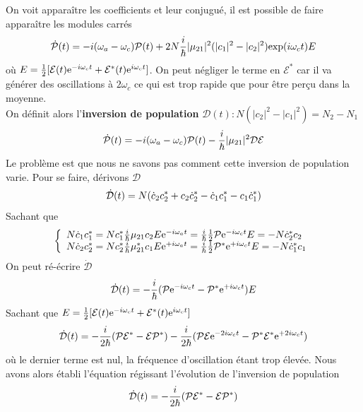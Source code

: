 On voit apparaître les coefficients et leur conjugué, il est possible de faire apparaître les 
modules carrés
\begin{equation}
\dot {\cal P}(t) =  - i({\omega _a} - {\omega _c}){\cal P}(t) + 2N\frac{i}{\hbar }|{\mu _{21}}{|^2}(|{c_1}{|^2} - |{c_2}{|^2}){\rm{exp(}}i{\omega _c}t{\rm{)}}E
\end{equation}
où $E = \frac{1}{2}[{\cal E}(t){{\rm{e}}^{ - i{\omega _c}t}} + {{\cal E}^*}(t){{\rm{e}}^{i{\omega _c}t}}]$. On peut négliger le terme en $\mathcal{E}^*$ car il va générer des oscillations à $2\omega_c$ 
ce qui est trop rapide que pour être perçu dans la moyenne.\\

On définit alors l'\textbf{inversion de population} $\mathcal{D}(t) : N(|c_2|^2-|c_1|^2) = N_2-N_1$ 
\begin{equation}
\dot {\cal P}(t) =  - i({\omega _a} - {\omega _c}){\cal P}(t) - \frac{i}{\hbar }|{\mu _{21}}{|^2}{\cal D}{\cal E}
\end{equation}
Le problème est que nous ne savons pas comment cette inversion de population varie. Pour se faire, 
dérivons $\mathcal{D}$
\begin{equation}
\dot {\cal D}(t) = N({\dot c_2}c_2^* + {c_2}\dot c_2^* - {\dot c_1}c_1^* - {c_1}\dot c_1^*)
\end{equation}
Sachant que
\begin{equation}
\left\{\begin{array}{ll}
N{\dot c_1}c_1^* = Nc_1^*\frac{i}{\hbar }{\mu _{21}}{c_2}E{{\rm{e}}^{ - i{\omega _a}t}} = \frac{i}{\hbar }\frac{1}{2}{\cal P}{{\rm{e}}^{ - i{\omega _c}t}}E =  - N\dot c_2^*{c_2}\\
N{\dot c_2}c_2^* = Nc_2^*\frac{i}{\hbar }\mu _{21}^*{c_1}E{{\rm{e}}^{ + i{\omega _a}t}} = \frac{i}{\hbar }\frac{1}{2}{{\cal P}^*}{{\rm{e}}^{ + i{\omega _c}t}}E =  - N\dot c_1^*{c_1}
\end{array}\right.
\end{equation}
On peut ré-écrire $\dot{\mathcal{D}}$
\begin{equation}
\dot {\cal D}(t) =  - \frac{i}{\hbar }({\cal P}{{\rm{e}}^{ - i{\omega _c}t}} - {{\cal P}^*}{{\rm{e}}^{ + i{\omega _c}t}})E
\end{equation}
Sachant que $E = \frac{1}{2}[{\cal E}(t){{\rm{e}}^{ - i{\omega _c}t}} + {{\cal E}^*}(t){{\rm{e}}^{i{\omega _c}t}}]$
\begin{equation}
\dot {\cal D}(t) =  - \frac{i}{{2\hbar }}({\cal P}{{\cal E}^*} - {\cal E}{{\cal P}^*}) - \frac{i}{{2\hbar }}({\cal P}{\cal E}{{\rm{e}}^{ - 2i{\omega _c}t}} - {{\cal P}^*}{{\cal E}^*}{{\rm{e}}^{ + 2i{\omega _c}t}})
\end{equation}
où le dernier terme est nul, la fréquence d'oscillation étant trop élevée. Nous avons alors établi
l'équation régissant l'évolution de l'inversion de population
\begin{equation}
\dot {\cal D}(t) =  - \frac{i}{{2\hbar }}({\cal P}{{\cal E}^*} - {\cal E}{{\cal P}^*})
\end{equation}



